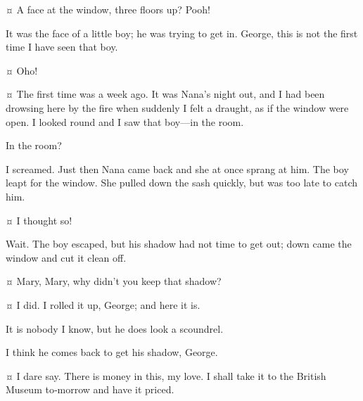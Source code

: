 \begin{drama}
\mrdarlingspeaks {}¤
A face at the window, three floors up?
Pooh!

\mrsdarlingspeaks
It was the face of a little boy; he was trying to get in.
George, this is not the first time I have seen that boy.

\mrdarlingspeaks {}¤
Oho!

\mrsdarlingspeaks {}¤
The first time was a week ago.
It was Nana’s night out, and I had been drowsing here by the fire when suddenly I felt a draught,
as if the window were open.
I looked round and I saw that boy—in the room.

\mrdarlingspeaks
In the room?

\mrsdarlingspeaks
I screamed.
Just then Nana came back and she at once sprang at him.
The boy leapt for the window.
She pulled down the sash quickly, but was too late to catch him.

\mrdarlingspeaks {}¤
I thought so!

\mrsdarlingspeaks
Wait.
The boy escaped, but his shadow had not time to get out; down came the window and cut it clean off.

\mrdarlingspeaks {}¤
Mary, Mary, why didn’t you keep that shadow?

\mrsdarlingspeaks {}¤
I did.
I rolled it up, George; and here it is.


\mrdarlingspeaks
It is nobody I know, but he does look a scoundrel.

\mrsdarlingspeaks
I think he comes back to get his shadow, George.

\mrdarlingspeaks {}¤
I dare say.
There is money in this, my love.
I shall take it to the British Museum to‐morrow and have it priced.



\end{drama}

